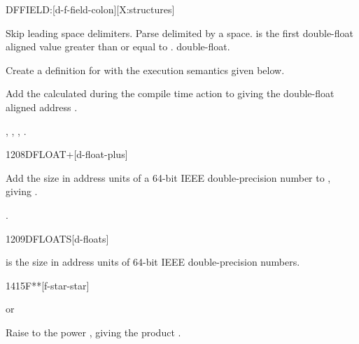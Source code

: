 
\begin{worddef}{}{DFFIELD:}[d-f-field-colon][X:structures]
\item {}

	Skip leading space delimiters. Parse  delimited by
	a space.  is the first double-float aligned value
	greater than or equal to .  
	double-float.

	Create a definition for  with the execution semantics
	given below.

\execute[name] 

	Add the  calculated during the compile time action
	to  giving the double-float aligned address
	.

\see {},
	,
	, \linebreak
	.
\end{worddef}


\begin{worddef}{1208}{DFLOAT+}[d-float-plus]
\item {}

	Add the size in address units of a 64-bit IEEE double-precision
	number to , giving .

\see {}.
\end{worddef}


\begin{worddef}{1209}{DFLOATS}[d-floats]
\item {}

	 is the size in address units of  64-bit
	IEEE double-precision numbers.
\end{worddef}


\begin{worddef}{1415}{F**}[f-star-star]
\item {} or

	Raise  to the power , giving the product
	.
\end{worddef}


